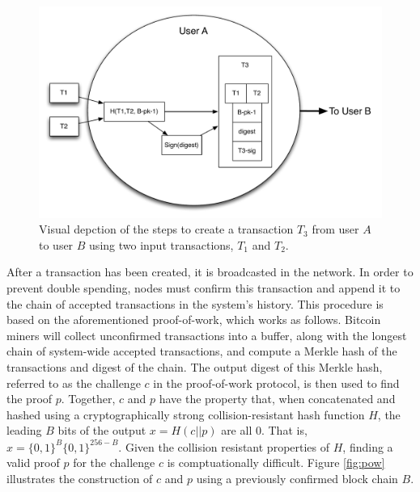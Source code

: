 \begin{center}
\begin{figure}
\includegraphics[scale=0.4]{./images/transaction_create.pdf}
\caption{Visual depction of the steps to create a transaction $T_3$ from user $A$ to user $B$ using two input transactions, $T_1$ and $T_2$.}
\label{fig:transaction-create}
\end{figure}
\end{center}

After a transaction has been created, it is broadcasted in the network. In order to prevent double spending, nodes must confirm this transaction and append it to the chain of accepted transactions in the system's history. This procedure is based on the aforementioned proof-of-work, which works as follows. Bitcoin miners will collect unconfirmed transactions into a buffer, along with the longest chain of system-wide accepted transactions, and compute a Merkle hash of the transactions and digest of the chain. The output digest of this Merkle hash, referred to as the challenge $c$ in the proof-of-work protocol, is then used to find the proof $p$. Together, $c$ and $p$ have the property that, when concatenated and hashed using a cryptographically strong collision-resistant hash function $H$, the leading $B$ bits of the output $x = H(c || p)$ are all $0$. That is, $x = \{0,1\}^B\{0,1\}^{256-B}$. Given the collision resistant properties of $H$, finding a valid proof $p$ for the challenge $c$ is comptuationally difficult. Figure \ref{fig:pow} illustrates the construction of $c$ and $p$ using a previously confirmed block chain $B$.

